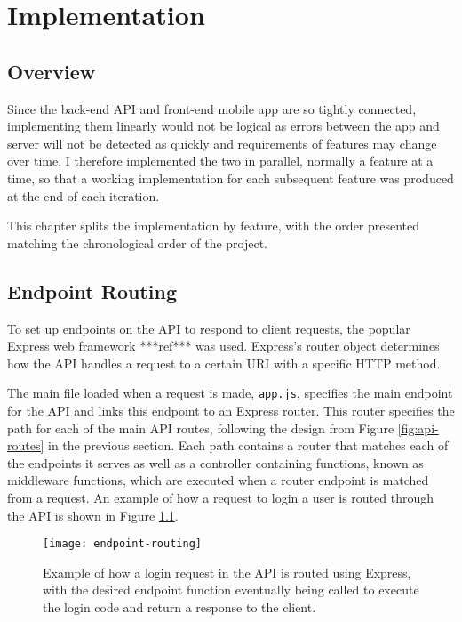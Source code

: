 \chapter{Implementation} \label{chapter:implementation}


\section{Overview}

Since the back-end API and front-end mobile app are so tightly connected, implementing them linearly would not be logical as errors between the app and server will not be detected as quickly and requirements of features may change over time. I therefore implemented the two in parallel, normally a feature at a time, so that a working implementation for each subsequent feature was produced at the end of each iteration.

This chapter splits the implementation by feature, with the order presented matching the chronological order of the project.

\section{Endpoint Routing}

To set up endpoints on the API to respond to client requests, the popular Express web framework ***ref*** was used. Express's router object determines how the API handles a request to a certain URI with a specific HTTP method.

The main file loaded when a request is made, \texttt{app.js}, specifies the main endpoint for the API and links this endpoint to an Express router. This router specifies the path for each of the main API routes, following the design from Figure \ref{fig:api-routes} in the previous section. Each path contains a router that matches each of the endpoints it serves as well as a controller containing functions, known as middleware functions, which are executed when a router endpoint is matched from a request. An example of how a request to login a user is routed through the API is shown in Figure \ref{fig:endpoint-routing}.

\begin{figure}[hbt]
  \centering
  \texttt{[image: endpoint-routing]}
  \caption{Example of how a login request in the API is routed using Express, with the desired endpoint function eventually being called to execute the login code and return a response to the client.}
  \label{fig:endpoint-routing}
\end{figure}

